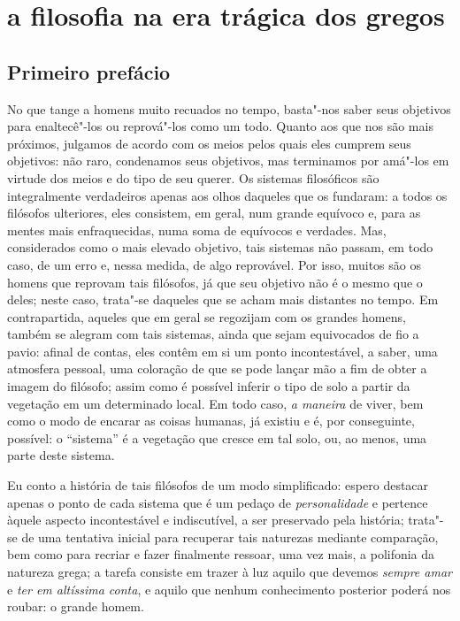 \part{a filosofia na era trágica dos gregos}

\chapter{Primeiro prefácio}

No que tange a homens muito recuados no tempo, basta"-nos saber seus
 objetivos para enaltecê"-los ou reprová"-los como um todo. Quanto aos que
 nos são mais próximos, julgamos de acordo com os meios pelos quais eles
 cumprem seus objetivos: não raro, condenamos seus objetivos, mas terminamos
 por amá"-los em virtude dos meios e do tipo de seu querer. Os sistemas
 filosóficos são integralmente verdadeiros apenas aos olhos daqueles que os
 fundaram: a todos os filósofos ulteriores, eles consistem, em geral, num
 grande equívoco e, para as mentes mais enfraquecidas, numa soma de equívocos
 e verdades. Mas, considerados como o mais elevado objetivo, tais sistemas
 não passam, em todo caso, de um erro e, nessa medida, de algo reprovável.
 Por isso, muitos são os homens que reprovam tais filósofos, já que seu
 objetivo não é o mesmo que o deles; neste caso, trata"-se daqueles que se
 acham mais distantes no tempo. Em contrapartida, aqueles que em geral se
 regozijam com os grandes homens, também se alegram com tais sistemas, ainda
 que sejam equivocados de fio a pavio: afinal de contas, eles contêm em si um
 ponto incontestável, a saber, uma atmosfera pessoal, uma coloração \label{atmosferapessoal} 
 de que se pode lançar mão a fim de obter a imagem do filósofo; assim 
 como é possível inferir o tipo de solo a partir da vegetação
 em um determinado local. \label{possivelinferir} Em todo caso, \textit{a maneira} 
 de viver, bem como o modo de encarar as coisas \label{amaneirade} 
 humanas, já existiu e é, por conseguinte, possível: o ``sistema''
é a vegetação que cresce em tal solo, ou, ao menos, uma parte deste sistema. 

Eu conto a história de tais filósofos de um modo simplificado: espero
destacar \label{simplificado} apenas o ponto de cada sistema que é um pedaço
de \textit{personalidade} e pertence àquele aspecto incontestável e indiscutível,
 a ser preservado pela história; trata"-se de uma tentativa inicial para
 recuperar tais naturezas mediante \label{comparacao} comparação, bem como
 para recriar e fazer finalmente ressoar, uma vez mais, a polifonia da
 natureza grega; a tarefa consiste em trazer à luz aquilo que devemos 
 \textit{sempre amar} e \textit{ter em altíssima conta}, e aquilo que nenhum
 conhecimento posterior poderá nos roubar: o \label{ograndehomem} grande
 homem.


